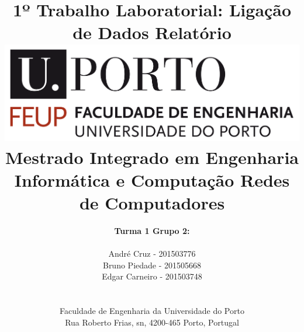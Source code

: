 \documentclass[a4paper]{article}
\begin{document}
\setlength{\textwidth}{16cm}
\setlength{\textheight}{22cm}

\title{\Huge\textbf{1º Trabalho Laboratorial:}\linebreak\linebreak
\Huge\textbf{Ligação de Dados}\linebreak\linebreak\linebreak
\Large\textbf{Relatório}\linebreak\linebreak
\linebreak\linebreak
\includegraphics[scale=0.1]{images/feup-logo.png}\linebreak\linebreak
\linebreak
\Large{Mestrado Integrado em Engenharia Informática e Computação} \linebreak\linebreak
\Large{Redes de Computadores}\linebreak
}

\author{\textbf{Turma 1 Grupo 2:}\\
\linebreak\\
André Cruz - 201503776 \\
Bruno Piedade - 201505668 \\
Edgar Carneiro - 201503748 \\
\linebreak\linebreak \\
 \\ Faculdade de Engenharia da Universidade do Porto \\ Rua Roberto Frias, s\/n, 4200-465 Porto, Portugal \linebreak\linebreak
\linebreak\linebreak\vspace{1cm}}
\end{document}
